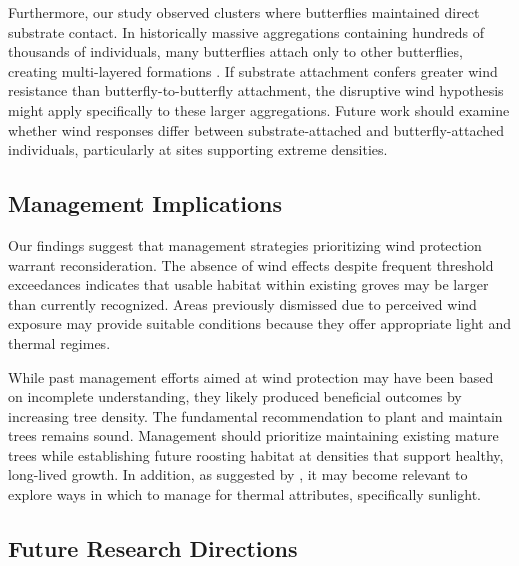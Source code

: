 Furthermore, our study observed clusters where butterflies maintained direct substrate contact. In historically massive aggregations containing hundreds of thousands of individuals, many butterflies attach only to other butterflies, creating multi-layered formations \citep{browerMonarchButterflyClusters2008}. If substrate attachment confers greater wind resistance than butterfly-to-butterfly attachment, the disruptive wind hypothesis might apply specifically to these larger aggregations. Future work should examine whether wind responses differ between substrate-attached and butterfly-attached individuals, particularly at sites supporting extreme densities.

\subsection{Management Implications}

Our findings suggest that management strategies prioritizing wind protection warrant reconsideration. The absence of wind effects despite frequent threshold exceedances indicates that usable habitat within existing groves may be larger than currently recognized. Areas previously dismissed due to perceived wind exposure may provide suitable conditions because they offer appropriate light and thermal regimes.

While past management efforts aimed at wind protection may have been based on incomplete understanding, they likely produced beneficial outcomes by increasing tree density. The fundamental recommendation to plant and maintain trees remains sound. Management should prioritize maintaining existing mature trees while establishing future roosting habitat at densities that support healthy, long-lived growth. In addition, as suggested by \citet{sanieeHierarchyScaleInfluence2022}, it may become relevant to explore ways in which to manage for thermal attributes, specifically sunlight.

\subsection{Future Research Directions}

